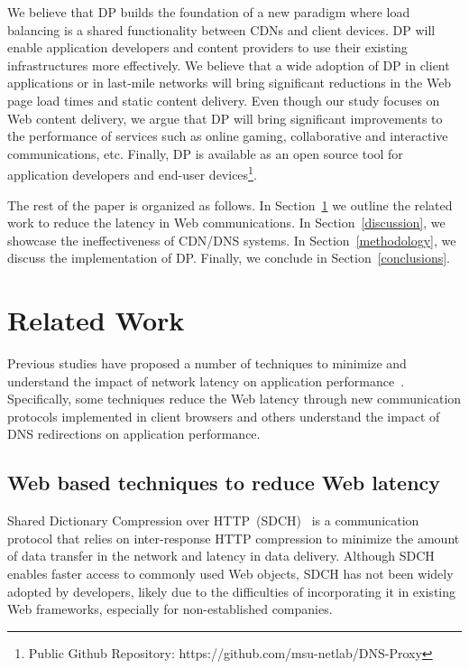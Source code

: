 \documentclass{llncs}
\begin{document}

We believe that DP builds the foundation of a new paradigm where load balancing is a shared functionality between CDNs and client devices.
DP will enable application developers and content providers to use their existing infrastructures more effectively.
We believe that a wide adoption of DP in client applications or in last-mile networks will bring significant reductions in the Web page load times and static content delivery.
Even though our study focuses on Web content delivery, we argue that DP will bring significant improvements to the performance of services such as online gaming, collaborative and interactive communications, etc.
Finally, DP is available as an open source tool for application developers and end-user devices\footnote{Public Github Repository: https://github.com/msu-netlab/DNS-Proxy}.

The rest of the paper is organized as follows. 
In Section~\ref{related_work} we outline the related work to reduce the latency in Web communications.
In Section~\ref{discussion}, we showcase the ineffectiveness of CDN/DNS systems.
In Section~\ref{methodology}, we discuss the implementation of DP. 
Finally, we conclude in Section~\ref{conclusions}. 




\section{Related Work}
\label{related_work}

Previous studies have proposed a number of techniques to minimize and understand the impact of network latency on application performance~\cite{GoelAppPerfSurvey14}.
Specifically, some techniques reduce the Web latency through new communication protocols implemented in client browsers and others understand the impact of DNS redirections on application performance.

\subsection{Web based techniques to reduce Web latency}

Shared Dictionary Compression over HTTP~(SDCH)~\cite{w3:sdch} is a communication protocol that relies on inter-response HTTP compression to minimize the amount of data transfer in the network and latency in data delivery.
Although SDCH enables faster access to commonly used Web objects, SDCH has not been widely adopted by developers, likely due to the difficulties of incorporating it in existing Web frameworks, especially for non-established companies. 
\end{document}

